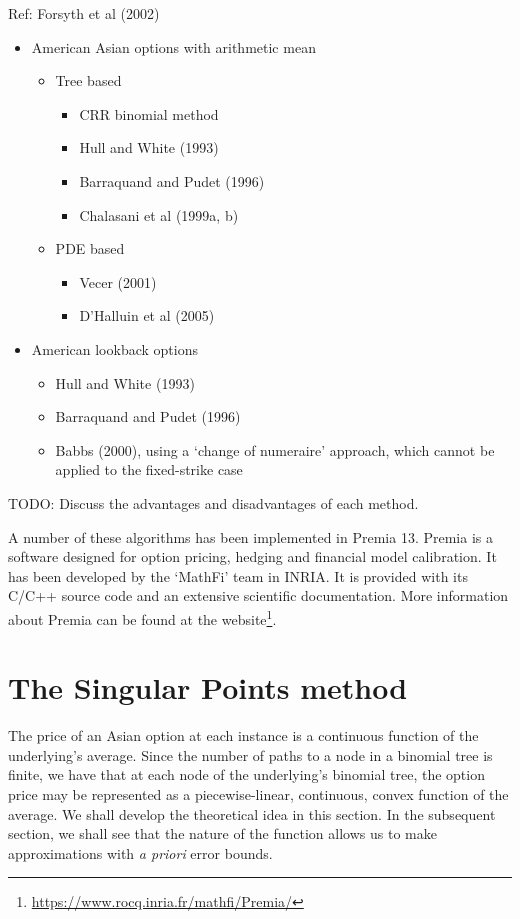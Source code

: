 Ref: Forsyth et al (2002)

\begin{itemize}
\item American Asian options with arithmetic mean
	\begin{itemize}
	\item Tree based
		\begin{itemize}
		\item CRR binomial method
		\item Hull and White (1993)
		\item Barraquand and Pudet (1996)
		\item Chalasani et al (1999a, b)
		\end{itemize}
	\item PDE based
		\begin{itemize}
		\item Vecer (2001)
		\item D’Halluin et al (2005)
		\end{itemize}
	\end{itemize}
\item American lookback options
	\begin{itemize}
	\item Hull and White (1993)
	\item Barraquand and Pudet (1996)
	\item Babbs (2000), using a `change of numeraire' approach, which cannot be applied to the fixed-strike case
	\end{itemize}
\end{itemize}

TODO: Discuss the advantages and disadvantages of each method.

A number of these algorithms has been implemented in Premia 13. Premia is a software designed for option pricing, hedging and financial model calibration. It has been developed by the `MathFi' team in INRIA. It is provided with its C/C++ source code and an extensive scientific documentation. More information about Premia can be found at the website\footnote{\url{https://www.rocq.inria.fr/mathfi/Premia/}}.



\section{The Singular Points method}
\label{sec:sp-asian-method}

The price of an Asian option at each instance is a continuous function of the underlying's average. Since the number of paths to a node in a binomial tree is finite, we have that at each node of the underlying's binomial tree, the option price may be represented as a piecewise-linear, continuous, convex function of the average. We shall develop the theoretical idea in this section. In the subsequent section, we shall see that the nature of the function allows us to make approximations with \emph{a priori} error bounds.


